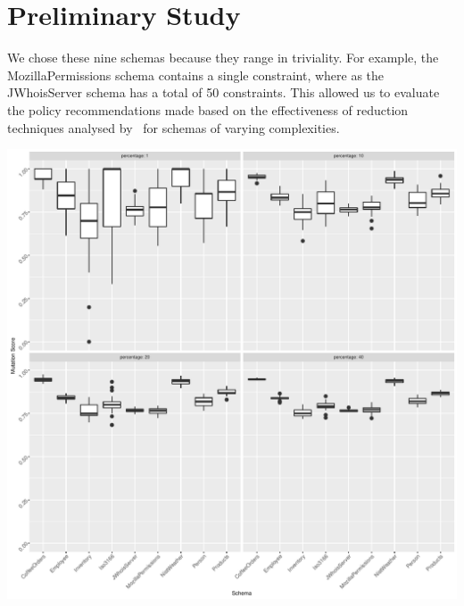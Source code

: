 \section{Preliminary Study}



We chose these nine schemas because they range in triviality. For example, the MozillaPermissions schema contains a
single constraint, where as the JWhoisServer schema has a total of 50 constraints. This allowed us to evaluate the
policy recommendations made based on the effectiveness of reduction techniques analysed by \mr~for schemas of varying
complexities.

\hspace*{-1em}\includegraphics[scale = 0.5]{graphs/schema_vs_ms.pdf}
